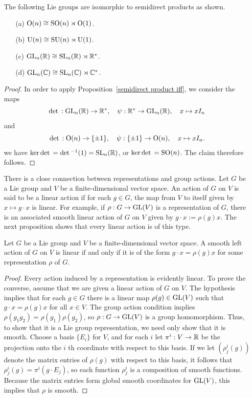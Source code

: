 \begin{proposition}\label{Lie groups as semidirect product}
The following Lie groups are isomorphic to semidirect products as shown.
\begin{itemize}
\item[(a)] $\mathrm{O}(n)\cong\mathrm{SO}(n)\rtimes\mathrm{O}(1)$.
\item[(b)] $\mathrm{U}(n)\cong\mathrm{SU}(n)\rtimes\mathrm{U}(1)$.
\item[(c)] $\mathrm{GL}_n(\mathbb{R})\cong\mathrm{SL}_n(\mathbb{R})\rtimes\mathbb{R}^*$.
\item[(d)] $\mathrm{GL}_n(\mathbb{C})\cong\mathrm{SL}_n(\mathbb{C})\rtimes\mathbb{C}^*$.
\end{itemize}
\end{proposition}
\begin{proof}
In order to apply Proposition~\ref{semidirect product iff}, we consider the maps
\[\mathrm{det}\,:\mathrm{GL}_n(\mathbb{R})\to\mathbb{R}^*,\quad \psi:\mathbb{R}^*\to\mathrm{GL}_n(\mathbb{R}),\quad x\mapsto xI_n\]
and
\[\mathrm{det}\,:\mathrm{O}(n)\to\{\pm 1\},\quad \psi:\{\pm 1\}\to\mathrm{O}(n),\quad x\mapsto xI_n.\]
we have $\ker\mathrm{det}\,=\mathrm{det}\,^{-1}(1)=\mathrm{SL}_n(\mathbb{R})$, or $\ker\mathrm{det}\,=\mathrm{SO}(n)$. The claim therefore follows.
\end{proof}
There is a close connection between representations and group actions. Let $G$ be a Lie group and $V$ be a finite-dimensional vector space. An action of $G$ on $V$ is said to be a linear action if for each $g\in G$, the map from $V$ to itself given by $x\mapsto g\cdot x$ is linear. For example, if $\rho:G\to\mathrm{GL}(V)$ is a representation of $G$, there is an associated smooth linear action of $G$ on $V$ given by $g\cdot x:=\rho(g)x$. The next proposition shows that every linear action is of this type.
\begin{proposition}
Let $G$ be a Lie group and $V$ be a finite-dimensional vector space. A smooth left action of $G$ on $V$ is linear if and only if it is of the form $g\cdot x=\rho(g)x$ for some representation $\rho$ of $G$.
\end{proposition}
\begin{proof}
Every action induced by a representation is evidently linear. To prove the converse, assume that we are given a linear action of $G$ on $V$. The hypothesis implies that for each $g\in G$ there is a linear map $\rho(g)\in\mathrm{GL}(V)$ such that $g\cdot x=\rho(g)x$ for all $x\in V$. The group action condition implies $\rho(g_1g_2)=\rho(g_1)\rho(g_2)$, so $\rho:G\to\mathrm{GL}(V)$ is a group homomorphism. Thus, to show that it is a Lie group representation, we need only show that it is smooth. Choose a basis $\{E_i\}$ for $V$, and for each $i$ let $\pi^i:V\to\mathbb{R}$ be the projection onto the $i$ th coordinate with respect to this basis. If we let $(\rho_j^i(g))$ denote the matrix entries of $\rho(g)$ with respect to this basis, it follows that $\rho_j^i(g)=\pi^i(g\cdot E_j)$, so each function $\rho_j^i$ is a composition of smooth functions. Because the matrix entries form global smooth coordinates for $\mathrm{GL}(V)$, this implies that $\rho$ is smooth.
\end{proof}
